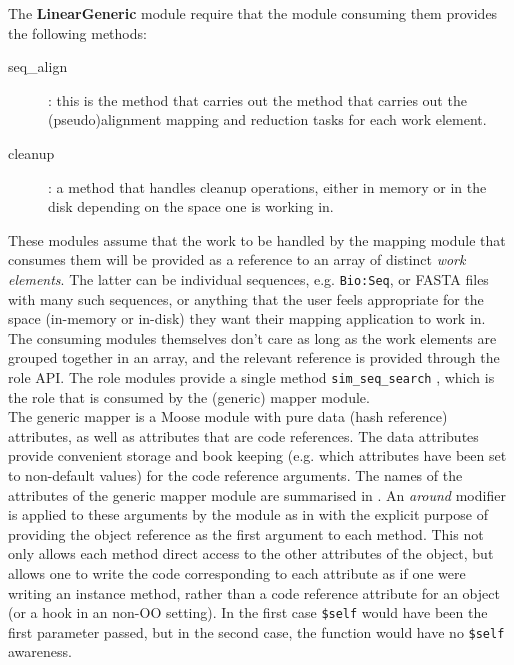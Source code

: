 \documentclass[10pt]{article}
\begin{document}
\noindent The \textbf{LinearGeneric} module require that the module consuming them provides the following methods:
\begin{description}
\item[seq\_align] : this is the method that carries out the method that carries out the (pseudo)alignment mapping and reduction tasks for each work element.
\item[cleanup]: a method that handles cleanup operations, either in memory or in the disk depending on the space one is working in.
\end{description}

\noindent  These modules assume that the work to be handled by the mapping module that consumes them will be provided as a reference to an array of distinct \textit{work elements}. The latter can be individual sequences, e.g. \texttt{Bio:Seq}, or FASTA files with many such sequences, or anything that the user feels appropriate for the space (in-memory or in-disk) they want their mapping application to work in. The consuming modules themselves don't care as long as the work elements are grouped together in an array, and the relevant reference is provided through the role API. The role modules provide a single method \texttt{sim\_seq\_search} , which is the role that is consumed by the (generic) mapper module.
\\
The generic mapper is a Moose module with pure data (hash reference) attributes, as well as attributes that are code references. The data attributes provide convenient storage and book keeping (e.g. which attributes have been set to non-default values) for the code reference arguments.  The names of the attributes of the generic mapper module are summarised in . An \textit{around} modifier is applied to these arguments by the module as in   with the explicit purpose of providing the object reference as the first argument to each method. This not only allows each method direct access to the other attributes of the object, but allows one to write the code corresponding to each attribute as if one were writing an instance method, rather than a code reference attribute for an object (or a hook in an non-OO setting). In the first case \texttt{\$self} would have been the first parameter passed, but in the second case, the function would have no \texttt{\$self} awareness. 
\end{document}
